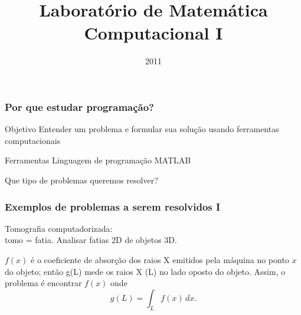 \documentclass[hyperref={pdfpagelabels=false}]{beamer}
\title{Laboratório de Matemática Computacional I} \author[M. Weber Mendonça]
\institute[UFSC]{\inst{1} Universidade Federal de Santa Catarina}
\date{2011}
\begin{document}
\begin{frame}
  \titlepage
\end{frame}
%
\begin{frame}
	\frametitle{Por que estudar programação?}
	\begin{block}{Objetivo}
		Entender um problema e formular sua solução usando ferramentas computacionais
	\end{block}
	\begin{block}{Ferramentas}
		Linguagem de programação MATLAB
	\end{block}
	\begin{center}
	   \begin{alertblock}{}
			\begin{center}
				Que tipo de problemas queremos resolver?
			\end{center}
	   \end{alertblock}
	\end{center}
\end{frame}
\begin{frame}
   \frametitle{Exemplos de problemas a serem resolvidos I}
   Tomografia computadorizada: \\
   
   tomo = fatia. Analisar fatias 2D de objetos 3D.
   
   $f(x)$ é o coeficiente de absorção dos raios X emitidos pela máquina no ponto $x$ do objeto; então g(L) mede os raios X (L) no lado oposto do objeto. Assim, o problema é encontrar $f(x)$ onde 
   \begin{equation*}
      g(L) = \int_L \! f(x) \, dx.
   \end{equation*}
	\begin{columns}
	\end{columns}
\end{frame}
\end{document}
